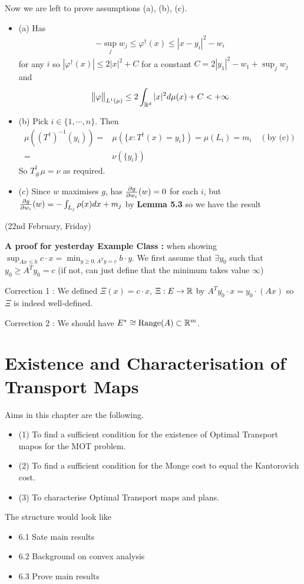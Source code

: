 \documentclass[12pt,a4paper]{article}
\newenvironment{proof}
{\begin{changemargin}{1cm}{0.5cm} 
	}%
	{\end{changemargin}
}
\renewenvironment{i}
{\begin{itemize} 
	}%
	{\end{itemize}
}
\newenvironment{p}
{\begin{proof} 
	}%
	{\end{proof}
}
\begin{document}
\begin{p}
Now we are left to prove assumptions (a), (b), (c).
\begin{i}
\item[(a)] Has
\begin{align*}
-\sup_{j} w_j \leq \varphi^{\dagger}(x) \leq |x- y_i|^2 - w_i
\end{align*}
for any $i$ so $|\varphi^{\dagger}(x)| \leq 2|x|^2 + C$ for a constant $C= 2|y_1|^2 - w_1 + \sup_j w_j$ and
\begin{align*}
\bigl\lVert\varphi\bigr\rVert_{L^1(\mu)} \leq 2\int_{\mathbb{R}^d} |x|^2 d\mu(x) + C < + \infty
\end{align*}
\item[(b)] Pick $i\in \{1, \cdots, n\}$. Then
\begin{align*}
\mu((T^{\dagger})^{-1} (y_i)) =& \mu(\{x: T^{\dagger}(x) = y_i \}) = \mu(L_i) = m_i \quad (\text{by (c)}) \\
=& \nu(\{y_i\})
\end{align*}
So $T^{\dagger}_{\#} \mu = \nu$ as required.
\item[(c)] Since $w$ maximises $g$, has $\frac{\partial g}{\partial w_i}(w) =0$ for each $i$, but $\frac{\partial g}{\partial w_i}(w) = - \int_{L_j} \rho(x) dx + m_j$ by \textbf{Lemma 5.3} so we have the result
\end{i} 
\eop
\end{p}
\s

\newday

(22nd February, Friday)
\s

\textbf{A proof for yesterday Example Class :} when showing $\sup_{Ax\leq b} c\cdot x = \min_{y\geq 0, A^T y =c} b\cdot y$. We first assume that $\exists y_0$ such that $y_0 \geq A^T y_0 =c$ (if not, can just define that the minimum takes value $\infty$)
\s

Correction 1 : We defined $\Xi(x) = c\cdot x$, $\Xi : E\rightarrow \mathbb{R}$ by $A^T y_0 \cdot x = y_0 \cdot (Ax)$ so $\Xi$ is indeed well-defined.

Correction 2 : We should have $E^* \cong \text{Range}(A) \subset \mathbb{R}^m$.
\s

\section{Existence and Characterisation of Transport Maps}

Aims in this chapter are the following.
\begin{i}
\item[(1)] To find a sufficient condition for the existence of Optimal Transport mapos for the MOT problem.
\item[(2)] To find a sufficient condition for the Monge cost to equal the Kantorovich cost.
\item[(3)] To characterise Optimal Transport maps and plans.
\end{i}
The structure would look like
\begin{i}
\item[6.1] Sate main results
\item[6.2] Background on convex analysis
\item[6.3] Prove main results
\end{i}
\end{document}
